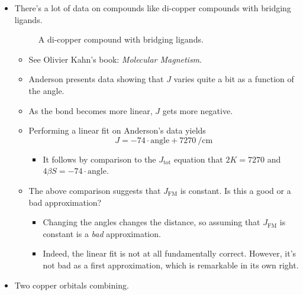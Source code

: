 \documentclass[../notes.tex]{subfiles}
\begin{document}
\begin{itemize}
\begin{itemize}
    \end{itemize}
    \item There's a lot of data on compounds like di-copper compounds with bridging ligands.
    \begin{figure}[h!]
        \centering
        \footnotesize
        \caption{A di-copper compound with bridging ligands.}
        \label{fig:dicopperSpin}
    \end{figure}
    \begin{itemize}
        \item See Olivier Kahn's book: \emph{Molecular Magnetism}.
        \item Anderson presents data showing that $J$ varies quite a bit as a function of the  angle.
        \item As the bond becomes more linear, $J$ gets more negative.
        \item Performing a linear fit on Anderson's data yields
        \begin{equation*}
            J = -74\cdot\text{angle}+\SI{7270}{\per\centi\meter}
        \end{equation*}
        \begin{itemize}
            \item It follows by comparison to the $J_\text{tot}$ equation that $2K=7270$ and $4\beta S=-74\cdot\text{angle}$.
        \end{itemize}
        \item The above comparison suggests that $J_\text{FM}$ is constant. Is this a good or a bad approximation?
        \begin{itemize}
            \item Changing the angles changes the distance, so assuming that $J_\text{FM}$ is constant is a \emph{bad} approximation.
            \item Indeed, the linear fit is not at all fundamentally correct. However, it's not bad as a first approximation, which is remarkable in its own right.
        \end{itemize}
    \end{itemize}
    \item Two copper orbitals combining.

\end{itemize}
\end{document}
